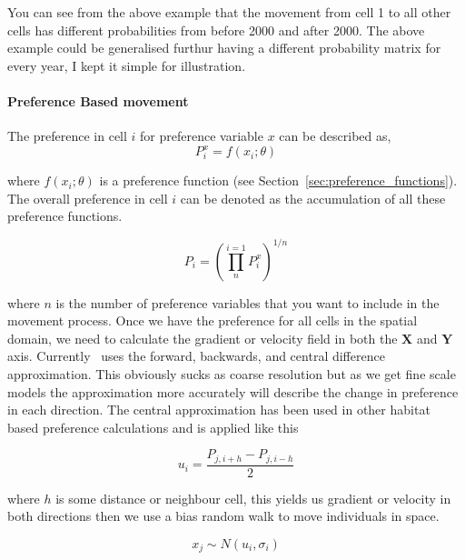 You can see from the above example that the movement from cell 1 to all other cells has different probabilities from before 2000 and after 2000. The above example could be generalised furthur having a different probability matrix for every year, I kept it simple for illustration.


\paragraph{Preference Based movement}\label{subsubsec:pref_movement}

The preference in cell $i$ for preference variable $x$ can be described as,
\begin{equation}
P_i^x = f(x_i; \theta)
\end{equation}

where $f(x_i; \theta)$ is a preference function (see Section~\ref{sec:preference_functions}). The overall preference in cell $i$ can be denoted as the accumulation of all these preference functions.

\begin{equation}
   P_i = \left(\prod_{n}^{i = 1}P_i^x\right)^{1/n}
\end{equation}

where $n$ is the number of preference variables that you want to include in the movement process. Once we have the preference for all cells in the spatial domain, we need to calculate the gradient or velocity field in both the $\textbf{X}$ and $\textbf{Y}$ axis. Currently \IBM\ uses the forward, backwards, and central difference approximation. This obviously sucks as coarse resolution but as we get fine scale models the approximation more accurately will describe the change in preference in each direction. The central approximation has been used in other habitat based preference calculations \citep{phillips2018individual} and is applied like this

\begin{equation}
u_i = \frac{P_{j, i + h} - P_{j, i - h}}{2}
\end{equation}

where $h$ is some distance or neighbour cell, this yields us gradient or velocity in both directions then we use a bias random walk to move individuals in space.

\begin{equation}
x_j \sim N(u_i, \sigma_i)
\end{equation}

